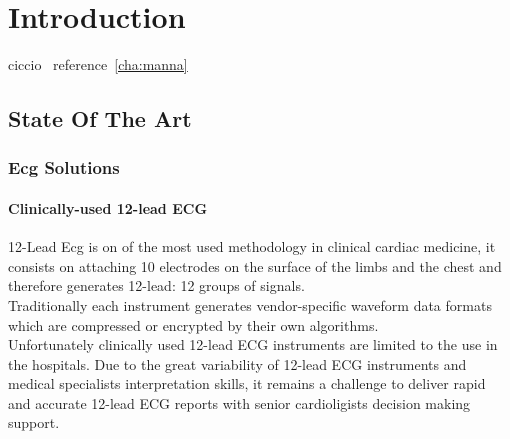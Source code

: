 
\chapter{Introduction}
ciccio~\label{cha:manna}
reference~\ref{cha:manna}

\section{State Of The Art}
\subsection{Ecg Solutions}
\subsubsection{Clinically-used 12-lead ECG}
12-Lead Ecg is on of the most used methodology in clinical cardiac medicine, it consists on attaching 10 electrodes on the surface of the limbs and the chest and therefore generates 12-lead: 12 groups of signals.\\
Traditionally each instrument generates vendor-specific waveform data formats which are compressed or encrypted by their own algorithms.\\
Unfortunately clinically used 12-lead ECG instruments are limited to the use in the hospitals. Due to the great variability of 12-lead ECG instruments and medical specialists interpretation skills, it remains a challenge to deliver rapid and accurate 12-lead ECG reports with senior cardioligists decision making support.\cite{Hsieh2012}
